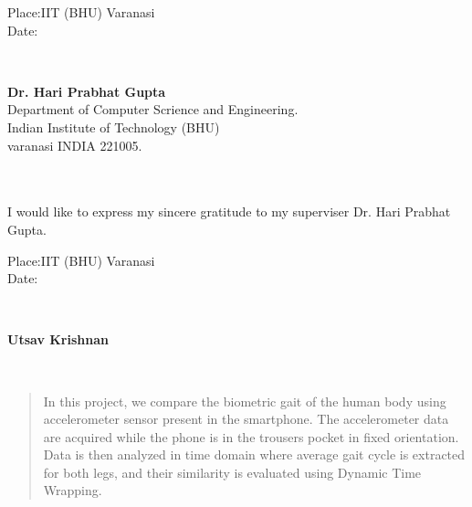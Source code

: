 \documentclass[a4paper]{report}
\begin{document}
\begin{minipage}{0.3\textwidth}
\begin{flushleft} \large
Place:IIT (BHU) Varanasi \\
 Date: \\%
\end{flushleft}
\end{minipage}
~
\begin{minipage}{0.67\textwidth}
\begin{flushright} \large{
\bfseries{Dr. Hari Prabhat Gupta}} \\
Department of Computer Scrience and Engineering.\\ %
Indian Institute of Technology (BHU)\\ varanasi 
INDIA 221005.
\end{flushright}
\end{minipage}\\[1cm]

\newpage
{}\\[2cm]
{\center I would like to express my sincere gratitude to my superviser Dr. Hari Prabhat Gupta.}\\[2cm]

\begin{minipage}{0.3\textwidth}
\begin{flushleft} \large
Place:IIT (BHU) Varanasi \\
 Date: \\%
\end{flushleft}
\end{minipage}
~
\begin{minipage}{0.67\textwidth}
\begin{flushright} \large{
\bfseries{Utsav Krishnan}} \\
\end{flushright}
\end{minipage}\\[1cm]



\begin{abstract}
In this project, we compare the biometric gait of the human body using accelerometer sensor present in the smartphone.\newline\newline
The accelerometer data are acquired while the phone is in the trousers pocket in fixed orientation.\newline\newline
Data is then analyzed in time domain where average gait cycle is extracted for both legs, and their similarity is evaluated using Dynamic Time Wrapping.
\end{abstract}
\end{document}
